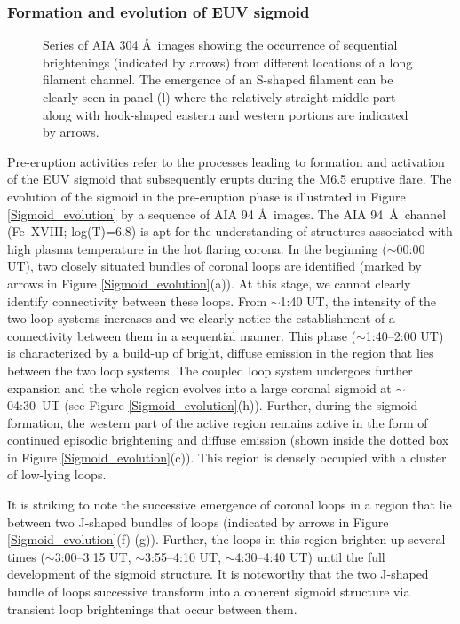 \documentclass[twocolumn]{aastex6}
\begin{document}
\subsubsection{Formation and evolution of EUV sigmoid}
\label{pre_eruption_sigmoid}

\begin{figure*}
\caption{Series of AIA 304 \AA~images showing the occurrence of sequential brightenings (indicated by arrows) from different locations of a long filament channel. The emergence of an S-shaped filament can be clearly seen in panel (l) where the relatively straight middle part along with hook-shaped eastern and western portions are indicated by arrows. 
}
\label{fig2}
\end{figure*}

Pre-eruption activities refer to the processes leading to formation and activation of the EUV sigmoid that subsequently erupts during the M6.5 eruptive flare. The evolution of the sigmoid in the pre-eruption phase is illustrated in Figure \ref{Sigmoid_evolution} by a sequence of AIA 94 \AA~images. 
The AIA 94~\AA~channel (Fe~{\footnotesize XVIII}; log(T)=6.8) is apt for the understanding of structures associated with high plasma temperature in the hot flaring corona. In the beginning ($ \sim $00:00 UT), two closely situated bundles of coronal loops are identified (marked by arrows in Figure \ref{Sigmoid_evolution}(a)). At this stage, we cannot clearly identify connectivity between these loops. From $ \sim $1:40 UT, the intensity of the two loop systems increases and we clearly notice the establishment of a connectivity between them in a sequential manner. This phase ($ \sim $1:40--2:00 UT) is characterized by a build-up of bright, diffuse emission in the region that lies between the two loop systems. The coupled loop system undergoes further expansion and the whole region evolves into a large coronal sigmoid at $\sim$ 04:30~UT (see Figure \ref{Sigmoid_evolution}(h)). Further, during the sigmoid formation, the western part of the active region remains active in the form of continued episodic brightening and diffuse emission (shown inside the dotted box in Figure \ref{Sigmoid_evolution}(c)). This region is densely occupied with a cluster of low-lying loops.

It is striking to note the successive emergence of coronal loops in a region that lie between two J-shaped bundles of loops (indicated by arrows in Figure \ref{Sigmoid_evolution}(f)-(g)). Further, the loops in this region brighten up several times ($ \sim $3:00--3:15 UT, $ \sim $3:55--4:10 UT, $ \sim $4:30--4:40 UT) until the full development of the sigmoid structure. 
It is noteworthy that the two J-shaped bundle of loops successive transform into a coherent sigmoid structure via transient loop brightenings that occur between them.
\end{document}
